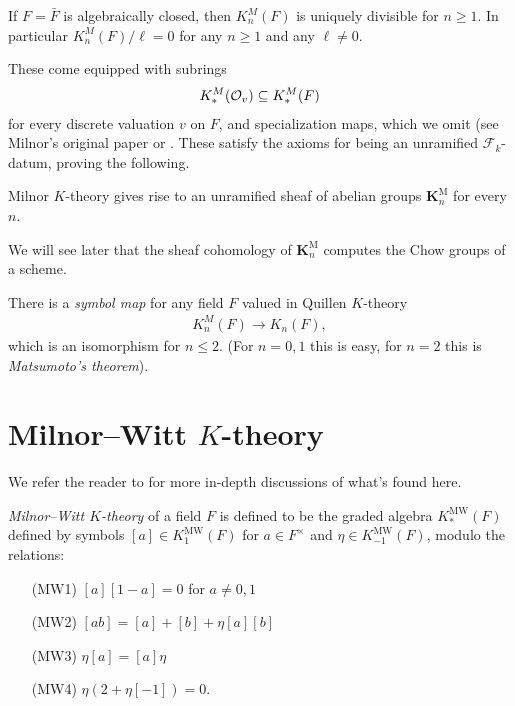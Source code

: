 \documentclass[11pt,openany]{book}
\providecommand{\MW}{\mathrm{MW}}
\providecommand{\KM}{\mathbf{K}^\mathrm{M}}
\begin{document}
\begin{example} \cite[III.7.2]{Kbook}
If $F = \bar{F}$ is algebraically closed, then $K_n^M(F)$ is uniquely divisible for $n\ge1$. In particular $K_n^M(F)/\ell = 0$ for any $n\ge 1$ and any $\ell\ne 0$.
\end{example}

%
These come equipped with subrings
\begin{align*}
    K^M_\ast(\mathcal{O}_v) \subseteq K^M_\ast(F)
\end{align*}
for every discrete valuation $v$ on $F$, and specialization maps, which we omit (see Milnor's original paper or \cite[7.3]{Kbook}. These satisfy the axioms for being an unramified $\mathcal{F}_k$-datum, proving the following.
\begin{proposition} Milnor $K$-theory gives rise to an unramified sheaf of abelian groups $\KM_n$ for every $n$.
\end{proposition}

We will see later that the sheaf cohomology of $\KM_n$ computes the Chow groups of a scheme.

\begin{proposition} There is a \textit{symbol map} for any field $F$ valued in Quillen $K$-theory
\begin{align*}
    K_n^M(F) \to K_n(F),
\end{align*}
which is an isomorphism for $n\le 2$. (For $n=0,1$ this is easy, for $n=2$ this is \textit{Matsumoto's theorem}).
\end{proposition}

\section{Milnor--Witt $K$-theory} We refer the reader to \cite{Deglise,Carlier} for more in-depth discussions of what's found here.

\begin{definition}\label{def:MW} 
\textit{Milnor--Witt $K$-theory} of a field $F$ is defined to be the graded algebra $K_\ast^\MW(F)$ defined by symbols $[a]\in K_1^{\MW}(F)$ for $a\in F^\times$ and $\eta \in K_{-1}^\MW(F)$, modulo the relations:
\begin{enumerate}
    \item[(MW1)] $[a][1-a] = 0$ for $a\ne 0,1$
    \item[(MW2)] $[ab] = [a]+[b] + \eta[a][b]$
    \item[(MW3)] $\eta[a]=[a]\eta$
    \item[(MW4)] $\eta(2+\eta[-1]) = 0$.
\end{enumerate}
\end{definition}
\end{document}
